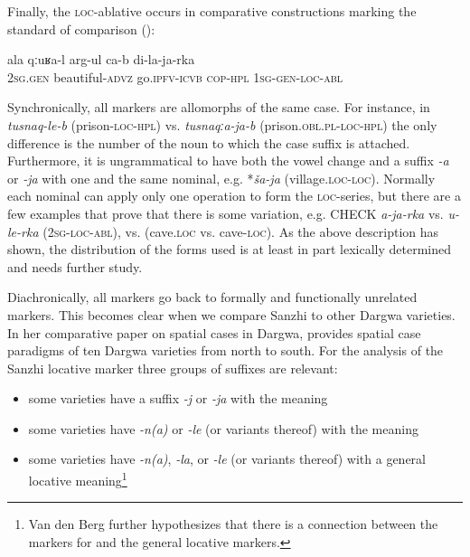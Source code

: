 Finally, the \textsc{loc}-ablative occurs in comparative constructions  marking the standard of comparison ():
%
\begin{exe}
	\ex	\label{ex:Yours (i.e. your story) is better than mine}
	\gll	ala	qːuʁa-l	arg-ul ca-b	di-la-ja-rka \\
		2\textsc{sg}.\textsc{gen}	beautiful-\textsc{advz}	go.\textsc{ipfv}-\textsc{icvb} \textsc{cop-hpl}	1\textsc{sg}-\textsc{gen}-\textsc{loc}-\textsc{abl}\\
	\glt	{}
\end{exe}


Synchronically, all markers are allomorphs of the same case. For instance, in \textit{tusnaq-le-b} (prison-\textsc{loc-hpl})  vs. \textit{tusnaqːa-ja-b} (prison.\textsc{obl.pl-loc-hpl})  the only difference is the number of the noun to which the case suffix is attached. Furthermore, it is ungrammatical to have both the vowel change and a suffix \textit{-a} or \textit{-ja} with one and the same nominal, e.g. *\textit{ša-ja} (village.\textsc{loc-loc}). Normally each nominal can apply only one operation to form the \textsc{loc}-series, but there are a few examples that prove that there is some variation, e.g. CHECK \textit{a-ja-rka} vs. \textit{u-le-rka} (2\textsc{sg-loc-abl}),  vs.  (cave.\textsc{loc} vs. cave-\textsc{loc}). As the above description has shown, the distribution of the forms used is at least in part lexically determined and needs further study.
 
Diachronically, all markers go back to formally and functionally unrelated markers. This becomes clear when we compare Sanzhi to other Dargwa varieties. In her comparative paper on spatial cases in Dargwa, \citet{vandenBerg2003c} provides spatial case paradigms of ten Dargwa varieties from north to south. For the analysis of the Sanzhi locative marker three groups of suffixes are relevant:
%
\begin{itemize}
	\item some varieties have a suffix \textit{-j} or \textit{-ja} with the meaning 
	\item some varieties have \textit{-n(a)} or \textit{-le} (or variants thereof) with the meaning 
	\item some varieties have \textit{-n(a)}, \textit{-la}, or \textit{-le} (or variants thereof) with a general locative meaning\footnote{Van den Berg further hypothesizes that there is a connection between the markers for  and the general locative markers.} 
\end{itemize}


